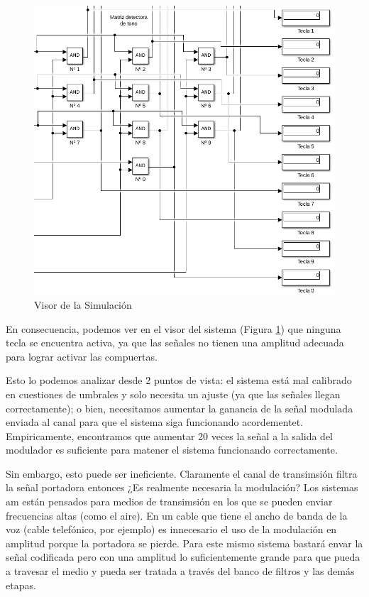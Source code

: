 \begin{figure}[!htb]
  \centering
  \includegraphics[width=400pt]{images/simulacion/reducido/sim.png}
  \caption{Visor de la Simulación}
  \label{fig:real_sim}
\end{figure}

\pagebreak

En consecuencia, podemos ver en el visor del sistema (Figura \ref{fig:real_sim}) que ninguna tecla se encuentra activa, ya que las señales no tienen una amplitud adecuada para lograr activar las compuertas.

Esto lo podemos analizar desde 2 puntos de vista: el sistema está mal calibrado en cuestiones de umbrales y solo necesita un ajuste (ya que las señales llegan correctamente); o bien, necesitamos aumentar la ganancia de la señal modulada enviada al canal para que el sistema siga funcionando acordementet. Empiricamente, encontramos que aumentar 20 veces la señal a la salida del modulador es suficiente para matener el sistema funcionando correctamente.

\pagebreak

Sin embargo, esto puede ser ineficiente. Claramente el canal de transimsión filtra la señal portadora entonces ¿Es realmente necesaria la modulación? Los sistemas \gls{am} están pensados para medios de transimsión en los que se pueden enviar frecuencias altas (como el aire). En un cable que tiene el ancho de banda de la voz (cable telefónico, por ejemplo) es innecesario el uso de la modulación en amplitud porque la portadora se pierde. Para este mismo sistema bastará envar la señal codificada pero con una amplitud lo suficientemente grande para que pueda a travesar el medio y pueda ser tratada a través del banco de filtros y las demás etapas.

